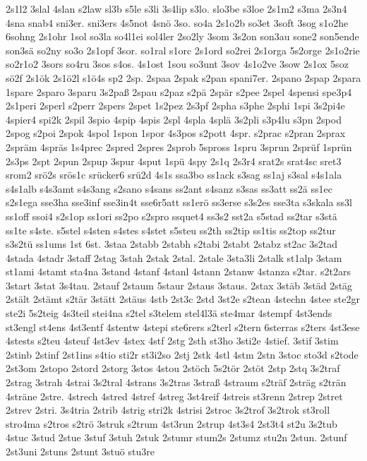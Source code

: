 {2s1l2
3slal
4slan
s2law
sl3b
s5le
s3li
3s4lip
s3lo.
slo3be
s3loe
2s1m2
s3ma
2s3n4
4sna
snab4
sni3er.
sni3ers
4s5not
4snö
3so.
so4a
2s1o2b
so3et
3soft
3sog
s1o2he
6sohng
2s1ohr
1sol
so3la
so4l1ei
sol4ler
2so2ly
3som
3s2on
son3au
sone2
son5ende
son3sä
so2ny
so3o
2s1opf
3sor.
so1ral
s1orc
2s1ord
so2rei
2s1orga
5s2orge
2s1o2rie
so2r1o2
3sors
so4ru
3sos
s4os.
4s1ost
1sou
so3unt
3sov
4s1o2ve
3sow
2s1ox
5soz
sö2f
2s1ök
2s1ö2l
s1ö4s
sp2
2sp.
2spaa
2spak
s2pan
spani7er.
2spano
2spap
2spara
1spare
2sparo
3sparu
3s2paß
2spau
s2paz
s2pä
2spär
s2pee
2spel
4spensi
spe3p4
2s1peri
2sperl
s2perr
2spers
2spet
1s2pez
2s3pf
2spha
s3phe
2sphi
1spi
3s2pi4e
4spier4
spi2k
2spil
3spio
4spip
4spis
2spl
4spla
4splä
3s2pli
s3p4lu
s3pn
2spod
2spog
s2poi
2spok
4spol
1spon
1spor
4s3pos
s2pott
4spr.
s2prac
s2pran
2sprax
2spräm
4spräs
1s4prec
2spred
2spres
2sprob
5spross
1spru
3sprun
2sprüf
1sprün
2s3ps
2spt
2spun
2spup
3spur
4sput
1spü
4spy
2s1q
2s3r4
srat2s
srat4sc
sret3
srom2
srö2s
srös1c
srücker6
srü2d
4s1s
ssa3bo
ss1ack
s3sag
ss1aj
s3sal
s4s1ala
s4s1alb
s4s3amt
s4s3ang
s2sano
s4sans
ss2ant
s4sanz
s3sas
ss3att
ss2ä
ss1ec
s2s1ega
sse3ha
sse3inf
sse3in4t
sse6r5att
ss1erö
ss3erse
s3s2es
sse3ta
s3skala
ss3l
ss1off
ssoi4
s2s1op
ss1ori
ss2po
s2spro
ssquet4
ss3s2
sst2a
s5stad
ss2tar
s3stä
ss1te
s4ste.
s5stel
s4sten
s4stes
s4stet
s5steu
ss2th
ss2tip
ss1tis
ss2top
ss2tur
s3s2tü
ss1ums
1st
6st.
3staa
2stabb
2stabh
s2tabi
2stabt
2stabz
st2ac
3s2tad
4stada
4stadr
3staff
2stag
3stah
2stak
2stal.
2stale
3sta3li
2stalk
st1alp
3stam
st1ami
4stamt
sta4na
3stand
4stanf
4stanl
4stann
2stanw
4stanza
s2tar.
s2t2ars
3start
3stat
3s4tau.
2stauf
2staum
5staur
2staus
3staus.
2stax
3stäb
3städ
2stäg
2stält
2stämt
s2tär
3stätt
2stäus
4stb
2st3c
2std
3st2e
s2tean
4stechn
4stee
ste2gr
ste2i
5s2teig
4s3teil
stei4na
s2tel
s3telem
stel4l3ä
ste4mar
4stempf
4st3ends
st3engl
st4ens
4st3entf
4stentw
4stepi
ste6rers
s2terl
s2tern
6sterras
s2ters
4st3ese
4stests
s2teu
4steuf
4st3ev
4stex
4stf
2stg
2sth
st3ho
3sti2e
4stief.
3stif
3stim
2stinb
2stinf
2st1ins
s4tio
sti2r
st3i2so
2stj
2stk
4stl
4stm
2stn
3stoc
sto3d
s2tode
2st3om
2stopo
2stord
2storg
3stos
4stou
2stöch
5s2tör
2stöt
2stp
2stq
3s2traf
2strag
3strah
4strai
3s2tral
4strans
3s2tras
3straß
4straum
s2träf
2sträg
s2trän
4sträne
2stre.
4strech
4stred
4stref
4streg
3st4reif
4streis
st3renn
2strep
2stret
2strev
2stri.
3s4tria
2strib
4strig
stri2k
4strisi
2stroc
3s2trof
3s2trok
st3roll
stro4ma
s2tros
s2trö
3struk
s2trum
4st3run
2strup
4st3s4
2st3t4
st2u
3s2tub
4stuc
3stud
2stue
3stuf
3stuh
2stuk
2stumr
stum2s
2stumz
stu2n
2stun.
2stunf
2st3uni
2stuns
2stunt
3stuö
stu3re
}
